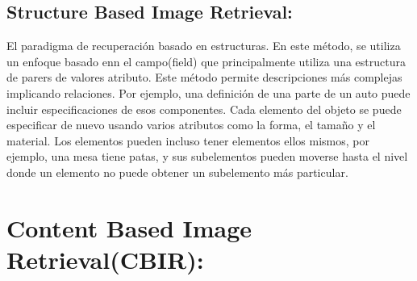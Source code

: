 \documentclass{llncs}
\begin{document}
\subsection{Structure Based Image Retrieval:}

El paradigma de recuperaci\'on basado en estructuras. En este m\'etodo, se utiliza un enfoque basado enn el campo(field) que principalmente
utiliza una estructura de parers de valores atributo. Este m\'etodo permite descripciones m\'as complejas implicando relaciones. Por ejemplo,
una definici\'on de una parte de un auto puede incluir especificaciones de esos componentes. Cada elemento del objeto se puede especificar 
de nuevo usando varios atributos como la forma, el tama\~{n}o y el material. Los elementos pueden incluso tener elementos ellos mismos, por 
ejemplo, una mesa tiene patas, y sus subelementos pueden moverse hasta el nivel donde un elemento no puede obtener un subelemento m\'as particular.

\section{Content Based Image Retrieval(CBIR):}
\end{document}
